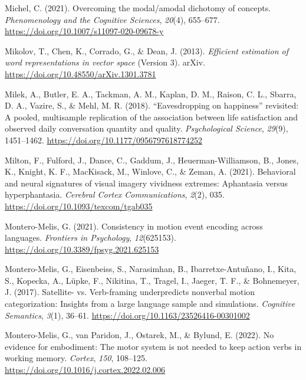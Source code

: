 \documentclass[
  12pt,
  man,floatsintext]{apa7}
\newlength{\cslhangindent}
\newlength{\cslentryspacingunit} %
\newenvironment{CSLReferences}[2] %
 {%
  \setlength{\parindent}{0pt}
  \ifodd #1
  \let\oldpar\par
  \def\par{\hangindent=\cslhangindent\oldpar}
  \fi
  \setlength{\parskip}{#2\cslentryspacingunit}
 }%
 {}
\begin{document}
\begin{CSLReferences}{1}{0}
\leavevmode{}%
Michel, C. (2021). Overcoming the modal/amodal dichotomy of concepts. \emph{Phenomenology and the Cognitive Sciences}, \emph{20}(4), 655--677. \url{https://doi.org/10.1007/s11097-020-09678-y}

\leavevmode{}%
Mikolov, T., Chen, K., Corrado, G., \& Dean, J. (2013). \emph{Efficient estimation of word representations in vector space} (Version 3). {arXiv}. \url{https://doi.org/10.48550/arXiv.1301.3781}

\leavevmode{}%
Milek, A., Butler, E. A., Tackman, A. M., Kaplan, D. M., Raison, C. L., Sbarra, D. A., Vazire, S., \& Mehl, M. R. (2018). {``{Eavesdropping} on happiness''} revisited: {A} pooled, multisample replication of the association between life satisfaction and observed daily conversation quantity and quality. \emph{Psychological Science}, \emph{29}(9), 1451--1462. \url{https://doi.org/10.1177/0956797618774252}

\leavevmode{}%
Milton, F., Fulford, J., Dance, C., Gaddum, J., Heuerman-Williamson, B., Jones, K., Knight, K. F., MacKisack, M., Winlove, C., \& Zeman, A. (2021). Behavioral and neural signatures of visual imagery vividness extremes: Aphantasia versus hyperphantasia. \emph{Cerebral Cortex Communications}, \emph{2}(2), 035. \url{https://doi.org/10.1093/texcom/tgab035}

\leavevmode{}%
Montero-Melis, G. (2021). Consistency in motion event encoding across languages. \emph{Frontiers in Psychology}, \emph{12}(625153). \url{https://doi.org/10.3389/fpsyg.2021.625153}

\leavevmode{}%
Montero-Melis, G., Eisenbeiss, S., Narasimhan, B., Ibarretxe-Antuñano, I., Kita, S., Kopecka, A., Lüpke, F., Nikitina, T., Tragel, I., Jaeger, T. F., \& Bohnemeyer, J. (2017). Satellite- vs. Verb-framing underpredicts nonverbal motion categorization: Insights from a large language sample and simulations. \emph{Cognitive Semantics}, \emph{3}(1), 36--61. \url{https://doi.org/10.1163/23526416-00301002}

\leavevmode{}%
Montero-Melis, G., van Paridon, J., Ostarek, M., \& Bylund, E. (2022). No evidence for embodiment: {The} motor system is not needed to keep action verbs in working memory. \emph{Cortex}, \emph{150}, 108--125. \url{https://doi.org/10.1016/j.cortex.2022.02.006}


\end{CSLReferences}
\end{document}
